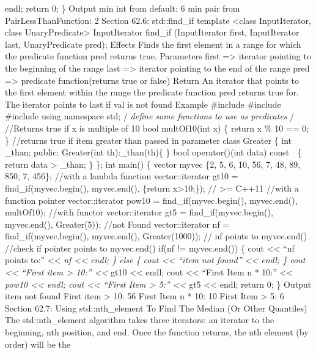 endl; return 0; \} Output min int from default: 6 min pair from
PairLessThanFunction: 2 Section 62.6: std::ﬁnd\_if template
\textless class InputIterator, class UnaryPredicate\textgreater{}
InputIterator find\_if (InputIterator first, InputIterator last,
UnaryPredicate pred); Eﬀects Finds the ﬁrst element in a range for which
the predicate function pred returns true. Parameters first
=\textgreater{} iterator pointing to the beginning of the range last
=\textgreater{} iterator pointing to the end of the range pred
=\textgreater{} predicate function(returns true or false) Return An
iterator that points to the ﬁrst element within the range the predicate
function pred returns true for. The iterator points to last if val is
not found Example \#include \#include \#include using namespace std;
/\emph{ define some functions to use as predicates }/ //Returns true if
x is multiple of 10 bool multOf10(int x) \{ return x \% 10 == 0; \}
//returns true if item greater than passed in parameter class Greater \{
int \_than; public: Greater(int th):\_than(th)\{ \} bool operator()(int
data) const  \{ return data \textgreater{} \_than; \} \}; int main() \{
vector myvec \{2, 5, 6, 10, 56, 7, 48, 89, 850, 7, 456\}; //with a
lambda function vector::iterator gt10 = find\_if(myvec.begin(),
myvec.end(), \href{int\%20x}{}\{return x\textgreater10;\}); //
\textgreater= C++11 //with a function pointer vector::iterator pow10 =
find\_if(myvec.begin(), myvec.end(), multOf10); //with functor
vector::iterator gt5 = find\_if(myvec.begin(), myvec.end(), Greater(5));
//not Found vector::iterator nf = find\_if(myvec.begin(), myvec.end(),
Greater(1000)); // nf points to myvec.end() //check if pointer points to
myvec.end() if(nf != myvec.end()) \{ cout \textless\textless{} ``nf
points to:'' \textless\textless{} \emph{nf \textless\textless{} endl; \}
else \{ cout \textless\textless{} ``item not found''
\textless\textless{} endl; \} cout \textless\textless{} ``First item
\textgreater{} 10:'' \textless\textless{} }gt10 \textless\textless{}
endl; cout \textless\textless{} ``First Item n * 10:''
\textless\textless{} \emph{pow10 \textless\textless{} endl; cout
\textless\textless{} ``First Item \textgreater{} 5:''
\textless\textless{} }gt5 \textless\textless{} endl; return 0; \} Output
item not found First item \textgreater{} 10: 56 First Item n * 10: 10
First Item \textgreater{} 5: 6 Section 62.7: Using std::nth\_element To
Find The Median (Or Other Quantiles) The std::nth\_element algorithm
takes three iterators: an iterator to the beginning, nth position, and
end. Once the function returns, the nth element (by order) will be the
